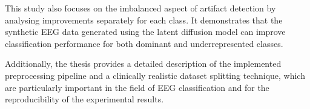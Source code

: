 This study also focuses on the imbalanced aspect of artifact detection by analysing improvements separately for each class. It demonstrates that the synthetic EEG data generated using the latent diffusion model can improve classification performance for both dominant and underrepresented classes.

Additionally, the thesis provides a detailed description of the implemented preprocessing pipeline and a clinically realistic dataset splitting technique, which are particularly important in the field of EEG classification and for the reproducibility of the experimental results.